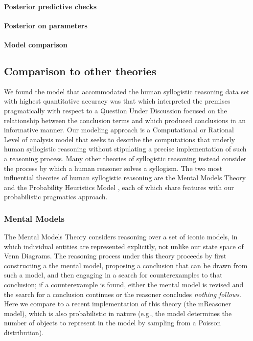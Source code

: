\documentclass[floatsintext, doc]{apa6}
\begin{document}
\paragraph{Posterior predictive checks}

\paragraph{Posterior on parameters}

\paragraph{Model comparison}


\subsection{Comparison to other theories}

We found the model that accommodated the human syllogistic reasoning data set with highest quantitative accuracy was that which interpreted the premises pragmatically with respect to a Question Under Discussion focused on the relationship between the conclusion terms and which produced conclusions in an informative manner. 
Our modeling approach is a Computational or Rational Level of analysis model \cite{marr1982vision, anderson1990adaptive} that seeks to describe the computations that underly human syllogistic reasoning without stipulating a precise implementation of such a reasoning process. 
Many other theories of syllogistic reasoning instead consider the process by which a human reasoner solves a syllogism.
The two most influential theories of human syllogistic reasoning are the Mental Models Theory \cite{johnsonlaird2006we, khemlani2013processes} and the Probability Heuristics Model \cite{Chater1999}, each of which share features with our probabilistic pragmatics approach. 

\subsubsection{Mental Models}

The Mental Models Theory considers reasoning over a set of iconic models, in which individual entities are represented explicitly, not unlike our state space of Venn Diagrams. 
The reasoning process under this theory proceeds by first constructing a the mental model, proposing a conclusion that can be drawn from such a model, and then engaging in a search for counterexamples to that conclusion; if a counterexample is found, either the mental model is revised and the search for a conclusion continues or the reasoner concludes \emph{nothing follows}. 
Here we compare to a recent implementation of this theory (the mReasoner model), which is also probabilistic in nature (e.g., the model determines the number of objects to represent in the model by sampling  from a Poisson distribution). 
\end{document}
